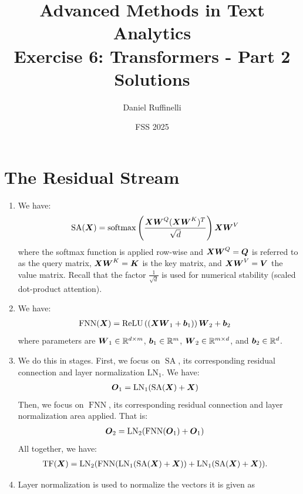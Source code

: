 \documentclass[11pt,a4paper]{article}
\title{Advanced Methods in Text Analytics \\ 
Exercise 6: Transformers - Part 2\\
\textbf{Solutions}}
\author{Daniel Ruffinelli}
\date{FSS 2025}
\newcommand\op[1]{\operatorname{#1}}
\begin{document}
\maketitle

\section{The Residual Stream}

\begin{enumerate}[label=(\alph*)]
    \item We have:
          \begin{align}
              \op{SA}(\mX) & = \op{softmax}\left(\frac{\mX\mW^Q(\mX\mW^K)^T}{\sqrt{d}}\right)\mX\mW^V
          \end{align}
          where the softmax function is applied row-wise and ${\boldsymbol{X}}{\boldsymbol{W}}^Q = {\boldsymbol{Q}}$ is
          referred to as the query matrix, ${\boldsymbol{X}}{\boldsymbol{W}}^K = {\boldsymbol{K}}$ is the key matrix, and
          ${\boldsymbol{X}}{\boldsymbol{W}}^V = {\boldsymbol{V}}$ the value matrix.
          Recall that the factor $\frac{1}{\sqrt{d}}$ is used for numerical
          stability (scaled dot-product attention).
    \item We have:
          \begin{align}
              \op{FNN}(\mX) & = \text{ReLU}\left((\mX\mW_1 + \vb_1)\right)\mW_2 + \vb_2
          \end{align}
          where parameters are ${\boldsymbol{W}}_1\in\mathbb{R}^{d\times m}$, ${\boldsymbol{b}}_1\in\mathbb{R}^m$,
          ${\boldsymbol{W}}_2\in\mathbb{R}^{m\times d}$, and ${\boldsymbol{b}}_2\in\mathbb{R}^d$.
    \item We do this in stages. First, we focus on $\op{SA}$, its
          corresponding residual connection and layer normalization $\op{LN_1}$.
          We have:
          \begin{align}
              \op{\mO_1} & = \op{LN_1}(\op{SA}(\mX) + \mX)
          \end{align}
          Then, we focus on $\op{FNN}$, its corresponding residual connection
          and layer normalization area applied.
          That is:
          \begin{align}
              \op{\mO_2} & = \op{LN_2}(\op{FNN}(\mO_1) + \mO_1)
          \end{align}
          All together, we have:
          \begin{align}
              \op{TF}(\mX) & = \op{LN_2}(\op{FNN}(\op{LN_1}(\op{SA}(\mX) + \mX)) + \op{LN_1}(\op{SA}(\mX) + \mX)).
          \end{align}
    \item Layer normalization is used to normalize the vectors it is given as

\end{enumerate}
\end{document}
